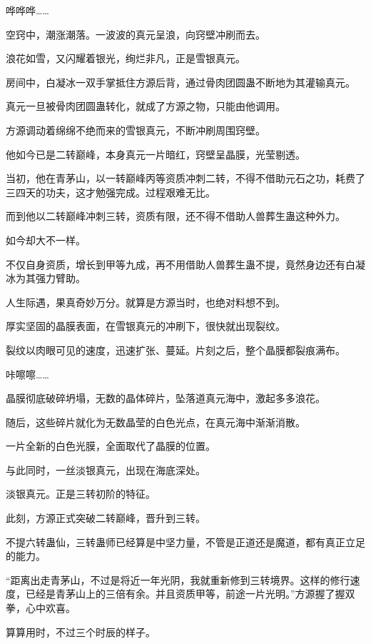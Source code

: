 
\begin{this_body}

哗哗哗……

空窍中，潮涨潮落。一波波的真元呈浪，向窍壁冲刷而去。

浪花如雪，又闪耀着银光，绚烂非凡，正是雪银真元。

房间中，白凝冰一双手掌抵住方源后背，通过骨肉团圆蛊不断地为其灌输真元。

真元一旦被骨肉团圆蛊转化，就成了方源之物，只能由他调用。

方源调动着绵绵不绝而来的雪银真元，不断冲刷周围窍壁。

他如今已是二转巅峰，本身真元一片暗红，窍壁呈晶膜，光莹剔透。

当初，他在青茅山，以一转巅峰丙等资质冲刺二转，不得不借助元石之功，耗费了三四天的功夫，这才勉强完成。过程艰难无比。

而到他以二转巅峰冲刺三转，资质有限，还不得不借助人兽葬生蛊这种外力。

如今却大不一样。

不仅自身资质，增长到甲等九成，再不用借助人兽葬生蛊不提，竟然身边还有白凝冰为其强力臂助。

人生际遇，果真奇妙万分。就算是方源当时，也绝对料想不到。

厚实坚固的晶膜表面，在雪银真元的冲刷下，很快就出现裂纹。

裂纹以肉眼可见的速度，迅速扩张、蔓延。片刻之后，整个晶膜都裂痕满布。

咔嚓嚓……

晶膜彻底破碎坍塌，无数的晶体碎片，坠落道真元海中，激起多多浪花。

随后，这些碎片就化为无数晶莹的白色光点，在真元海中渐渐消散。

一片全新的白色光膜，全面取代了晶膜的位置。

与此同时，一丝淡银真元，出现在海底深处。

淡银真元。正是三转初阶的特征。

此刻，方源正式突破二转巅峰，晋升到三转。

不提六转蛊仙，三转蛊师已经算是中坚力量，不管是正道还是魔道，都有真正立足的能力。

“距离出走青茅山，不过是将近一年光阴，我就重新修到三转境界。这样的修行速度，已经是青茅山上的三倍有余。并且资质甲等，前途一片光明。”方源握了握双拳，心中欢喜。

算算用时，不过三个时辰的样子。


\end{this_body}
